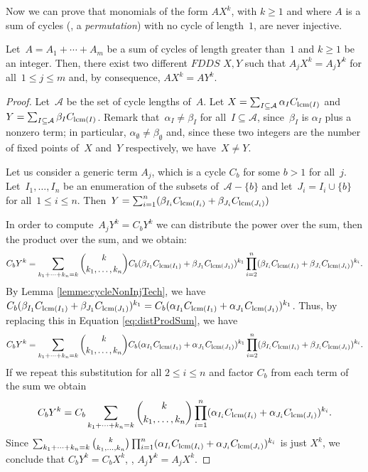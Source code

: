 	Now we can prove that monomials of the form $A X^k$, with $k \ge 1$ and where $A$ is a sum of cycles (\ie, a
        \emph{permutation}) with no cycle of length~$1$, are never injective.
	
	\begin{lemma}\label{lemme:noInjMonomeP1}
                Let~$A = A_1 + \cdots + A_m$ be a sum of cycles of length greater than~$1$ and $k \ge 1$ be an integer.
		Then, there exist two different $FDDS$ $X,Y$ such that $A_j X^k = A_j Y^k$ for all~$1 \le j \le m$ and, by consequence, $A X^k = A Y^k$.
	\end{lemma}

	\begin{proof}
                Let~$\mathcal{A}$ be the set of cycle lengths of~$A$.      
                Let $X = \sum_{I \subseteq \mathcal{A}} \alpha_I C_{\operatorname{lcm}(I)}$ and $Y = \sum_{I \subseteq \mathcal{A}} \beta_I C_{\operatorname{lcm}(I)}$. Remark that~$\alpha_I \ne \beta_I$ for all~$I \subseteq \mathcal{A}$, since~$\beta_I$ is $\alpha_I$ plus a nonzero term; in particular, $\alpha_\emptyset \ne \beta_\emptyset$ and, since these two integers are the number of fixed points of~$X$ and~$Y$ respectively, we have~$X \ne Y$.

                Let us consider a generic term $A_j$, which is a cycle $C_b$ for some $b>1$ for all~$j$. Let~$I_1, \ldots, I_n$ be an enumeration of the subsets of~$\mathcal{A}-\{b\}$ and let~$J_i = I_i \cup \{b\}$ for all~$1 \le i \le n$. Then~$Y = \sum_{i=1}^n (\beta_{I_i} C_{\operatorname{lcm}(I_i)} + \beta_{J_i} C_{\operatorname{lcm}(J_i)})$
		
		In order to compute~$A_j Y^k = C_b Y^k$ we can distribute the power over the sum, then the product over the sum, and we obtain:
		\begin{equation}\label{eq:distProdSum}
			C_b Y^k = \sum_{k_1+\cdots+k_n=k}\binom{k}{k_1,\ldots,k_n} C_b (\beta_{I_1} C_{\operatorname{lcm}(I_1)} + \beta_{J_1} C_{\operatorname{lcm}(J_1)})^{k_1}\prod_{i=2}^{n} (\beta_{I_i} C_{\operatorname{lcm}(I_i)} + \beta_{J_i} C_{\operatorname{lcm}(J_i)})^{k_i}.
		\end{equation}
		By Lemma \ref{lemme:cycleNonInjTech}, we have $C_b (\beta_{I_1} C_{\operatorname{lcm}(I_1)} + \beta_{J_1} C_{\operatorname{lcm}(J_1)})^{k_1} = C_b (\alpha_{I_1} C_{\operatorname{lcm}(I_1)} + \alpha_{J_1} C_{\operatorname{lcm}(J_1)})^{k_1}$.
		Thus, by replacing this in Equation \eqref{eq:distProdSum}, we have
		\[C_b Y^k = \sum_{k_1+\cdots+k_n=k}\binom{k}{k_1,\ldots,k_n} C_b (\alpha_{I_1} C_{\operatorname{lcm}(I_1)} + \alpha_{J_1} C_{\operatorname{lcm}(J_1)})^{k_1} \prod_{i=2}^{n} (\beta_{I_i} C_{\operatorname{lcm}(I_i)} + \beta_{J_i} C_{\operatorname{lcm}(J_i)})^{k_i}.\]
		If we repeat this substitution for all $2 \le i \le n$ and factor $C_b$ from each term of the sum we obtain
		\[C_b Y^k = C_b \sum_{k_1+\cdots+k_n=k}\binom{k}{k_1,\ldots,k_n}  \prod_{i=1}^{n} (\alpha_{I_i} C_{\operatorname{lcm}(I_i)} + \alpha_{J_i} C_{\operatorname{lcm}(J_i)})^{k_i}.\] 
		Since $\sum_{k_1+\cdots+k_n=k}\binom{k}{k_1,\ldots,k_n}  \prod_{i=1}^{n} (\alpha_{I_i} C_{\operatorname{lcm}(I_i)} + \alpha_{J_i} C_{\operatorname{lcm}(J_i)})^{k_i}$ is just $X^k$, we conclude that $C_b Y^k = C_b X^k$, \ie, $A_j Y^k = A_j X^k$.


\end{proof}
